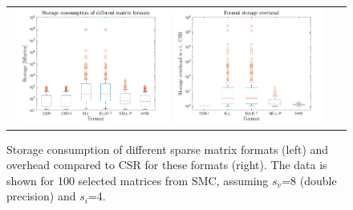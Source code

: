 \begin{figure}[p]
\begin{tabular}{cc}
    \includegraphics[width=0.48\textwidth]{plots/storage_consumption.pdf}
    \includegraphics[width=0.48\textwidth]{plots/storage_overhead.pdf} &
\end{tabular}
\caption[Storage consumption 
    of different sparse matrix formats
    and overhead compared to CSR]
    {Storage consumption 
    of different sparse matrix formats (left)
    and overhead compared to CSR for these formats (right).
    The data is shown for 100 selected matrices from SMC,
    assuming $s_v$=8 (double precision) and $s_i$=4.}
\label{2017-csr-spmv:fig:storage}
\end{figure}

